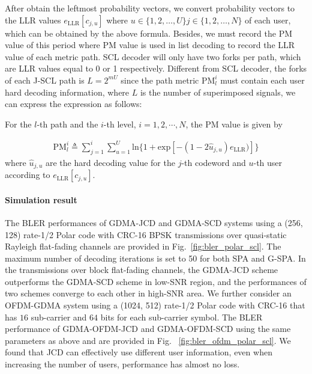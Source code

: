 After obtain the leftmost probability vectors, we convert probability vectors to the LLR values $e_{\text{LLR}} [c_{j,u} ]$  where $u \in \{1,2,…,U\}  j \in \{1,2,…,N\}$ of each user, which can be obtained by the above formula. Besides, we must record the PM value of this period where PM value is used in list decoding to record the LLR value of each metric path. SCL decoder will only have two forks per path, which are LLR values equal to 0 or 1  respectively. Different from SCL decoder, the forks of each J-SCL path is $L = 2^{mU}$ since the path metric $\text{PM}_l^i$ must contain each user hard decoding information, where $L$ is the number of superimposed signals, we can express the expression as follows:

For the $l$-th path and the $i$-th level, $i=1,2,\cdots,N$, the PM value is given by


\begin{align}
\text{PM}_l^i \triangleq \sum_{j=1}^{i} \sum_{u=1}^{U} \text{ln} \{ 1+\text{exp}[-(1-2 \hat{u}_{j,u} ) e_{\text{LLR}})] \}
\end{align}
where $\hat{u}_{j,u}$ are the hard decoding value for the $j$-th codeword and $u$-th user according to $e_\text{LLR} [c_{j,u} ]$. 

\paragraph{Simulation result}
The BLER performances of GDMA-JCD and GDMA-SCD systems using a (256, 128) rate-1/2 Polar code with CRC-16 BPSK transmissions over quasi-static Rayleigh flat-fading channels are provided in Fig.~\ref{fig:bler_polar_scl}. The maximum number of decoding iterations is set to 50 for both SPA and G-SPA. In the transmissions over block flat-fading channels, the GDMA-JCD scheme outperforms the GDMA-SCD scheme in low-SNR region, and the performances of two schemes converge to each other in high-SNR area. We further consider an OFDM-GDMA system using a (1024, 512) rate-1/2 Polar code with CRC-16 that has $16$ sub-carrier and $64$ bits for each sub-carrier symbol. The BLER performance of GDMA-OFDM-JCD and GDMA-OFDM-SCD using the same parameters as above and are provided in Fig.~ \ref{fig:bler_ofdm_polar_scl}. We found that JCD can effectively use different user information, even when increasing the number of users, performance has almost no loss.

